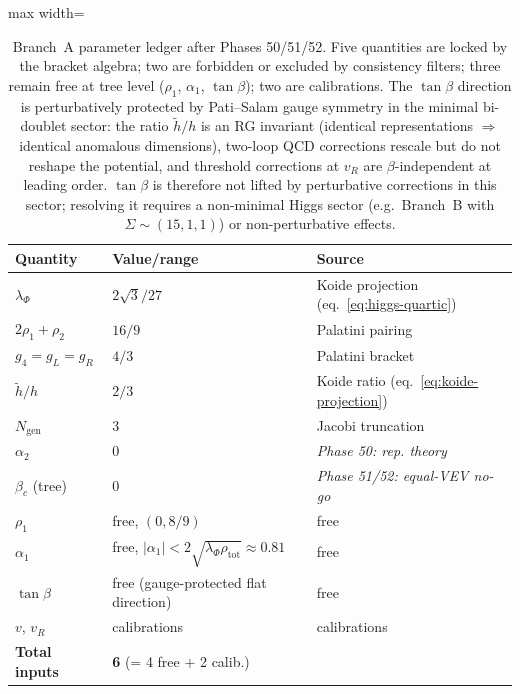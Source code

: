 \documentclass[11pt,a4paper]{article}
\theoremstyle{plain}
\theoremstyle{definition}
\theoremstyle{remark}
\begin{document}
\begin{table}[h]
\centering\small
\begin{adjustbox}{max width=\linewidth}\begin{tabular}{@{}lll@{}}
\toprule
Quantity & Value/range & Source \\
\midrule
$\lambda_\Phi$ & $2\sqrt{3}/27$ & Koide projection (eq.~\ref{eq:higgs-quartic}) \\
$2\rho_1 + \rho_2$ & $16/9$ & Palatini pairing \\
$g_4 = g_L = g_R$ & $4/3$ & Palatini bracket \\
$\tilde{h}/h$ & $2/3$ & Koide ratio (eq.~\ref{eq:koide-projection}) \\
$N_{\mathrm{gen}}$ & $3$ & Jacobi truncation \\
$\alpha_2$ & $0$ & \emph{Phase 50: rep. theory} \\
$\beta_c$ (tree) & $0$ & \emph{Phase 51/52: equal-VEV no-go} \\
\midrule
$\rho_1$ & free, $(0, 8/9)$ & free \\
$\alpha_1$ & free, $|\alpha_1|<2\sqrt{\lambda_\Phi\rho_{\mathrm{tot}}}\approx 0.81$ & free \\
$\tan\beta$ & free (gauge-protected flat direction) & free \\
$v$, $v_R$ & calibrations & calibrations \\
\midrule
\textbf{Total inputs} & \textbf{6} (= 4 free + 2 calib.) & \\
\bottomrule
\end{tabular}\end{adjustbox}
\caption{Branch~A parameter ledger after Phases 50/51/52.  Five
quantities are locked by the bracket algebra; two are forbidden or
excluded by consistency filters; three remain free at tree level
($\rho_1$, $\alpha_1$, $\tan\beta$); two are calibrations.
The $\tan\beta$ direction is perturbatively protected by
Pati--Salam gauge symmetry in the minimal bi-doublet sector:
the ratio $\tilde{h}/h$ is an RG invariant (identical
representations $\Rightarrow$ identical anomalous dimensions),
two-loop QCD corrections rescale but do not reshape the
potential, and threshold corrections at $v_R$ are
$\beta$-independent at leading order.  $\tan\beta$ is therefore
not lifted by perturbative corrections in this sector;
resolving it requires a non-minimal Higgs sector (e.g.\
Branch~B with $\Sigma \sim (15,1,1)$) or non-perturbative
effects.}
\label{tab:branch-A-ledger}
\end{table}
\end{document}
